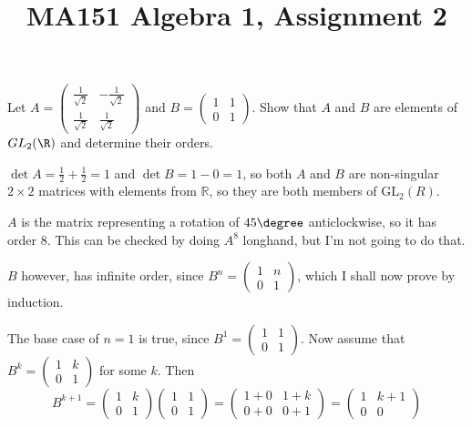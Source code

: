 \documentclass[a4paper]{article}
\title{MA151 Algebra 1, Assignment 2}
\begin{document}
\maketitle

\setlength{\parindent}{0em}
\setlength{\parskip}{1em}


\begin{questionbody}
Let $A = \begin{pmatrix} \frac1{\sqrt2} & -\frac1{\sqrt2} \\ \frac1{\sqrt2} & \frac1{\sqrt2} \end{pmatrix}$ and $B = \begin{pmatrix} 1 & 1 \\ 0 & 1 \end{pmatrix}$.
Show that $A$ and $B$ are elements of $GL_2(\R)$ and determine their orders.
\end{questionbody}

$\det A = \frac12 + \frac12 = 1$ and $\det B = 1 - 0 = 1$, so both $A$ and $B$ are non-singular $2 \times 2$ matrices with elements from $\mathbb R$, so they are both members of $\text{GL}_2(R)$.

$A$ is the matrix representing a rotation of $45\degree$ anticlockwise, so it has order 8. This can be checked by doing $A^8$ longhand, but I'm not going to do that.

$B$ however, has infinite order, since $B^n = \begin{pmatrix} 1 & n \\ 0 & 1 \end{pmatrix}$, which I shall now prove by induction.

The base case of $n=1$ is true, since $B^1 = \begin{pmatrix} 1 & 1 \\ 0 & 1 \end{pmatrix}$. Now assume that $B^k = \begin{pmatrix} 1 & k \\ 0 & 1 \end{pmatrix}$ for some $k$. Then \[
B^{k+1} = \begin{pmatrix} 1 & k \\ 0 & 1 \end{pmatrix}
\begin{pmatrix} 1 & 1 \\ 0 & 1 \end{pmatrix}
= \begin{pmatrix} 1+0 & 1+k \\ 0+0 & 0+1 \end{pmatrix}
= \begin{pmatrix} 1 & k+1 \\ 0 & 0 \end{pmatrix}
\]
\end{document}
